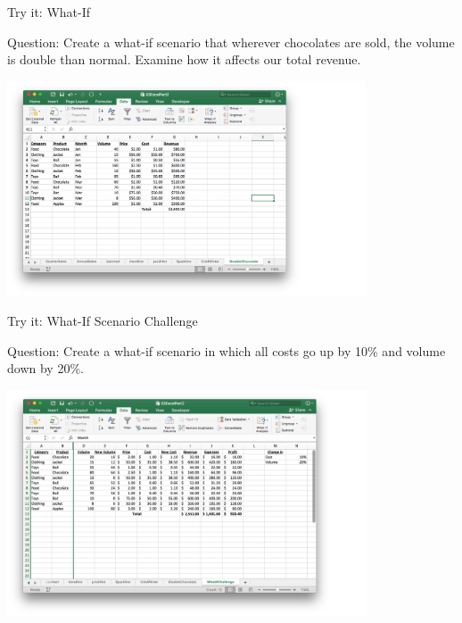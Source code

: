 \documentclass[xcolor=svgnames]{beamer}
\begin{document}
\begin{frame}{Try it: What-If}
\begin{exampleblock}{Question:} Create a what-if scenario that wherever chocolates are sold, the volume is double than normal. Examine how it affects our total revenue. 
\end{exampleblock}
\begin{center}
\includegraphics[width=0.8\textwidth]{DoubleChocolate}
\end{center}
\end{frame}


\begin{frame}{Try it: What-If Scenario Challenge}
\begin{exampleblock}{Question:} Create a what-if scenario in which all costs go up by 10\% and volume down by 20\%. 
\end{exampleblock}
\begin{center}
\includegraphics[width=0.8\textwidth]{badcase}
\end{center}
\end{frame}
\end{document}
